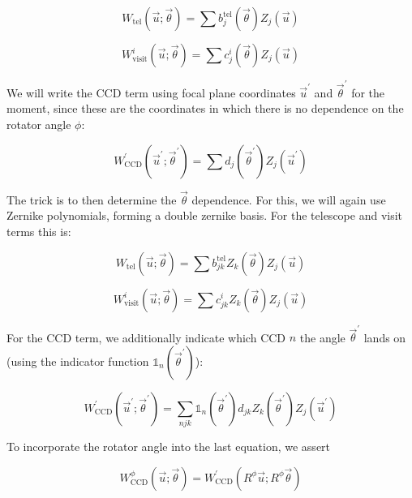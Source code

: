 \documentclass{article}
\begin{document}
\begin{equation}
    W_\mathrm{tel}\left(\vec{u}; \vec{\theta}\right) =
    \sum b^\mathrm{tel}_j (\vec{\theta}) Z_j(\vec{u})
\end{equation}

\begin{equation}
    W^i_\mathrm{visit}\left(\vec{u}; \vec{\theta}\right) =
    \sum c^i_j (\vec{\theta}) Z_j(\vec{u})
\end{equation}

We will write the CCD term using focal plane coordinates $\vec{u}^\prime$ and
$\vec{\theta}^\prime$ for the moment, since these are the coordinates in which
there is no dependence on the rotator angle $\phi$:

\begin{equation}
    W^\prime_\mathrm{CCD}\left(\vec{u}^\prime; \vec{\theta}^\prime\right) =
    \sum d_j (\vec{\theta}^\prime) Z_j(\vec{u}^\prime)
\end{equation}

The trick is to then determine the $\vec{\theta}$ dependence.  For this, we will
again use Zernike polynomials, forming a double zernike basis.  For the
telescope and visit terms this is:

\begin{equation}
    W_\mathrm{tel}\left(\vec{u}; \vec{\theta}\right) =
    \sum b^\mathrm{tel}_{jk} Z_k(\vec{\theta}) Z_j(\vec{u})
\end{equation}

\begin{equation}
    W^i_\mathrm{visit}\left(\vec{u}; \vec{\theta}\right) =
    \sum c^i_{jk} Z_k(\vec{\theta}) Z_j(\vec{u})
\end{equation}

For the CCD term, we additionally indicate which CCD $n$ the angle
$\vec{\theta}^\prime$ lands on (using the indicator function
$\mathbb{1}_n(\vec{\theta}^\prime)$):

\begin{equation}
    W^\prime_\mathrm{CCD}\left(\vec{u}^\prime; \vec{\theta}^\prime\right) =
    \sum_{njk} \mathbb{1}_n(\vec{\theta}^\prime) d_{jk} Z_k(\vec{\theta}^\prime) Z_j(\vec{u}^\prime)
\end{equation}

To incorporate the rotator angle into the last equation, we assert

\begin{equation}
    W^\phi_\mathrm{CCD}\left(\vec{u}; \vec{\theta}\right) =
    W^\prime_\mathrm{CCD}\left(R^\phi\vec{u}; R^\phi\vec{\theta}\right)
\end{equation}
\end{document}
